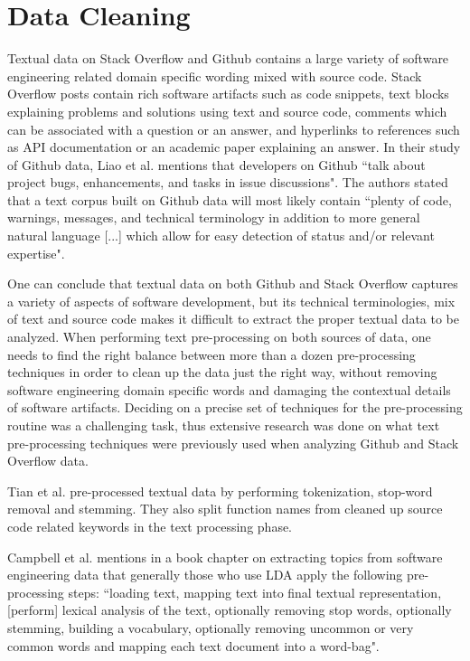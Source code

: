 
\section{Data Cleaning}
Textual data on Stack Overflow and Github contains a large variety of software engineering related domain specific wording mixed with source code. Stack Overflow posts contain rich software artifacts such as code snippets, text blocks explaining problems and solutions using text and source code, comments which can be associated with a question or an answer, and hyperlinks to references such as API documentation or an academic paper explaining an answer. In their study of Github data, Liao et al. \cite{liao2019status} mentions that developers on Github ``talk about project bugs, enhancements, and tasks in issue discussions". The authors stated that a text corpus built on Github data will most likely contain ``plenty of code, warnings, messages, and technical terminology in addition to more general natural language [...] which allow for easy detection of status and/or relevant expertise".

One can conclude that textual data on both Github and Stack Overflow captures a variety of aspects of software development, but its technical terminologies, mix of text and source code makes it difficult to extract the proper textual data to be analyzed. When performing text pre-processing on both sources of data, one needs to find the right balance between more than a dozen pre-processing techniques in order to clean up the data just the right way, without removing software engineering domain specific words and damaging the contextual details of software artifacts. Deciding on a precise set of techniques for the pre-processing routine was a challenging task, thus extensive research was done on what text pre-processing techniques were previously used when analyzing Github and Stack Overflow data.

Tian et al. \cite{tian2013predicting} pre-processed textual data by performing tokenization, stop-word removal and stemming. They also split function names from cleaned up source code related keywords in the text processing phase.

Campbell et al. \cite{campbell2015latent} mentions in a book chapter on extracting topics from software engineering data that generally those who use LDA apply the following pre-processing steps: ``loading text, mapping text into final textual representation, [perform] lexical analysis of the text, optionally removing stop words, optionally stemming, building a vocabulary, optionally removing uncommon or very common words and mapping each text document into a word-bag".


